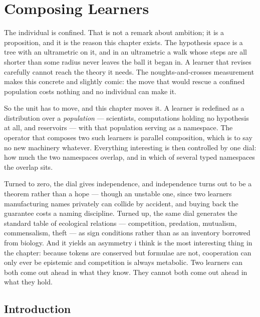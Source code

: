 \chapter{Composing Learners}
\label{ch:com}

\noindent
The individual is confined. That is not a remark about ambition; it is a
proposition, and it is the reason this chapter exists. The hypothesis space
is a tree with an ultrametric on it, and in an ultrametric a walk whose
steps are all shorter than some radius never leaves the ball it began in.
A learner that revises carefully cannot reach the theory it needs. The
noughts-and-crosses measurement makes this concrete and slightly comic: the
move that would rescue a confined population costs nothing and no individual
can make it.

So the unit has to move, and this chapter moves it. A learner is redefined
as a distribution over a \emph{population} --- scientists, computations
holding no hypothesis at all, and reservoirs --- with that population serving
as a namespace. The operator that composes two such learners is parallel
composition, which is to say no new machinery whatever. Everything
interesting is then controlled by one dial: how much the two namespaces
overlap, and in which of several typed namespaces the overlap sits.

Turned to zero, the dial gives independence, and independence turns out to
be a theorem rather than a hope --- though an unstable one, since two
learners manufacturing names privately can collide by accident, and buying
back the guarantee costs a naming discipline. Turned up, the same dial
generates the standard table of ecological relations --- competition,
predation, mutualism, commensalism, theft --- as sign conditions rather than
as an inventory borrowed from biology. And it yields an asymmetry i think is
the most interesting thing in the chapter: because tokens are conserved but
formulae are not, cooperation can only ever be epistemic and competition is
always metabolic. Two learners can both come out ahead in what they know.
They cannot both come out ahead in what they hold.

\bigskip

\section{Introduction}\label{com:S1}

